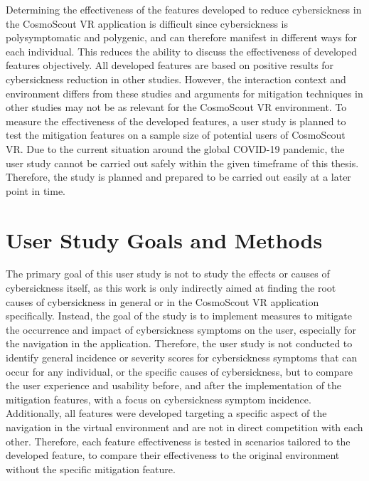Determining the effectiveness of the features developed to reduce cybersickness in the CosmoScout VR application is
difficult since cybersickness is polysymptomatic and polygenic, and can therefore manifest in different ways for each
individual.
This reduces the ability to discuss the effectiveness of developed features objectively.
All developed features are based on positive results for cybersickness reduction in other studies.
However, the interaction context and environment differs from these studies and arguments for mitigation techniques
in other studies may not be as relevant for the CosmoScout VR environment.
To measure the effectiveness of the developed features, a user study is planned to test the mitigation features on a
sample size of potential users of CosmoScout VR\@.
Due to the current situation around the global COVID-19 pandemic, the user study cannot be carried out safely within
the given timeframe of this thesis.
Therefore, the study is planned and prepared to be carried out easily at a later point in time.


\section{User Study Goals and Methods}\label{sec:user-study-goals-and-methods}

The primary goal of this user study is not to study the effects or causes of cybersickness itself, as this work is
only indirectly aimed at finding the root causes of cybersickness in general or in the CosmoScout VR application
specifically.
Instead, the goal of the study is to implement measures to mitigate the occurrence and impact of cybersickness
symptoms on the user, especially for the navigation in the application.
Therefore, the user study is not conducted to identify general incidence or severity scores for cybersickness symptoms
that can occur for any individual, or the specific causes of cybersickness, but to compare the user experience and
usability before, and after the implementation of the mitigation features, with a focus on cybersickness symptom
incidence.
Additionally, all features were developed targeting a specific aspect of the navigation in the virtual environment
and are not in direct competition with each other.
Therefore, each feature effectiveness is tested in scenarios tailored to the developed feature, to compare their
effectiveness to the original environment without the specific mitigation feature.


